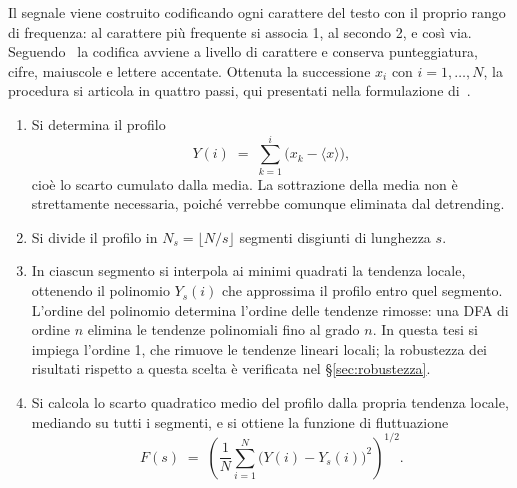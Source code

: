 Il segnale viene costruito codificando ogni carattere del testo con il proprio
rango di frequenza: al carattere più frequente si associa 1, al secondo 2, e
così via. Seguendo~\cite{lippi2019} la codifica avviene a livello di carattere e
conserva punteggiatura, cifre, maiuscole e lettere accentate. Ottenuta la
successione $x_i$ con $i = 1,\dots,N$, la procedura si articola in quattro
passi, qui presentati nella formulazione di~\cite{kantelhardt2001}.

\begin{enumerate}
  \item Si determina il profilo
    \begin{equation}
      Y(i) \;=\; \sum_{k=1}^{i}\bigl(x_k - \langle x\rangle\bigr),
      \label{eq:dfa-profilo}
    \end{equation}
    cioè lo scarto cumulato dalla media. La sottrazione della media non è
    strettamente necessaria, poiché verrebbe comunque eliminata dal detrending.
  \item Si divide il profilo in $N_s = \lfloor N/s \rfloor$ segmenti disgiunti
    di lunghezza $s$.
  \item In ciascun segmento si interpola ai minimi quadrati la tendenza locale,
    ottenendo il polinomio $Y_s(i)$ che approssima il profilo entro quel
    segmento. L'ordine del polinomio determina l'ordine delle tendenze rimosse:
    una DFA di ordine $n$ elimina le tendenze polinomiali fino al grado $n$. In
    questa tesi si impiega l'ordine 1, che rimuove le tendenze lineari locali;
    la robustezza dei risultati rispetto a questa scelta è verificata nel
    §\ref{sec:robustezza}.
  \item Si calcola lo scarto quadratico medio del profilo dalla propria
    tendenza locale, mediando su tutti i segmenti, e si ottiene la funzione di
    fluttuazione
    \begin{equation}
      F(s) \;=\; \left(\frac{1}{N}\sum_{i=1}^{N}
      \bigl(Y(i) - Y_s(i)\bigr)^2\right)^{1/2}.
      \label{eq:dfa-F}
    \end{equation}
\end{enumerate}

